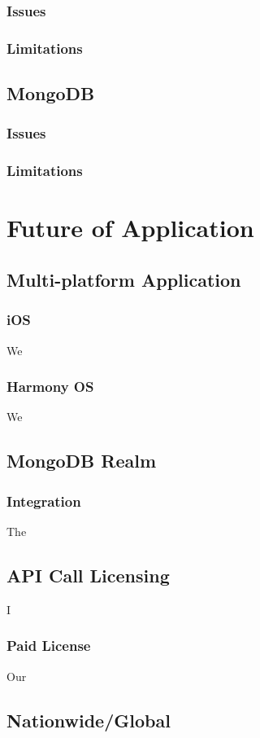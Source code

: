 \subsubsection{Issues}
\subsubsection{Limitations}
\subsection{MongoDB}
\subsubsection{Issues}
\subsubsection{Limitations}

\section{Future of Application}
\subsection{Multi-platform Application}
\subsubsection{iOS}
We
\subsubsection{Harmony OS}
We
\subsection{MongoDB Realm}
\subsubsection{Integration}
The
\subsection{API Call Licensing}
I
\subsubsection{Paid License}
Our
\subsection{Nationwide/Global}

